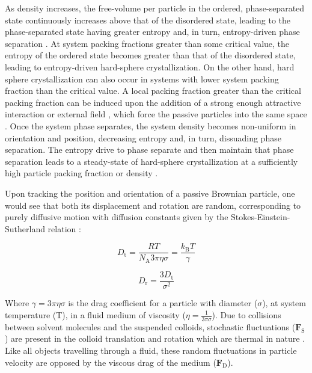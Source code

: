 \documentclass[11pt]{article}
\begin{document}
As density increases, the free-volume per particle in the ordered, phase-separated state continuously increases above that of the disordered state, leading to the phase-separated state having greater entropy and, in turn, entropy-driven phase separation \cite{Frenkel2}.  At system packing fractions greater than some critical value, the entropy of the ordered state becomes greater than that of the disordered state, leading to entropy-driven hard-sphere crystallization.  On the other hand, hard sphere crystallization can also occur in systems with lower system packing fraction than the critical value. A local packing fraction greater than the critical packing fraction can be induced upon the addition of a strong enough attractive interaction \cite{Babu} or external field \cite{Alexander}, which force the passive particles into the same space \cite{Pince}.  Once the system phase separates, the system density becomes non-uniform in orientation and position, decreasing entropy and, in turn, dissuading phase separation.  The entropy drive to phase separate and then maintain that phase separation leads to a steady-state of hard-sphere crystallization at a sufficiently high particle packing fraction or density \cite{Wood, Alder}. 

Upon tracking the position and orientation of a passive Brownian particle, one would see that both its displacement and rotation are random, corresponding to purely diffusive motion with diffusion constants given by the Stokes-Einstein-Sutherland relation \cite{Woolard, Kivelson}:

\begin{equation}\label{kin}
    D_{\text{t}}=\frac{RT}{N_{\text{A}}3\pi\eta\sigma}=\frac{k_{\text{B}}T}{\gamma}
\end{equation}
    
\begin{equation}\label{kout}
    D_{\text{r}}=\frac{3D_{\text{t}}}{\sigma^2} 
\end{equation}

\noindent Where $\gamma=3\pi\eta\sigma$ is the drag coefficient for a particle with diameter ($\sigma$), at system temperature (T), in a fluid medium of viscosity ($\eta=\frac{1}{3\pi\sigma}$).  Due to collisions between solvent molecules and the suspended colloids, stochastic fluctuations ($\boldsymbol{F}_{\text{S}}$) are present in the colloid translation and rotation which are thermal in nature \cite{Nelson}.  Like all objects travelling through a fluid, these random fluctuations in particle velocity are opposed by the viscous drag of the medium ($\boldsymbol{F}_{\text{D}}$).   
\end{document}
